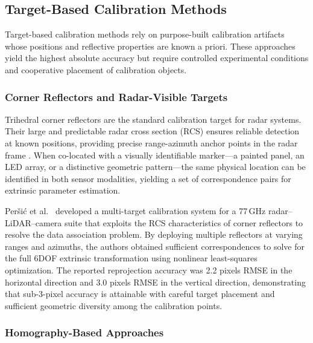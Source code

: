 \subsection{Target-Based Calibration Methods}\label{sec:target_based}

Target-based calibration methods rely on purpose-built calibration artifacts whose positions and reflective properties are known a priori. These approaches yield the highest absolute accuracy but require controlled experimental conditions and cooperative placement of calibration objects.

\subsubsection{Corner Reflectors and Radar-Visible Targets}

Trihedral corner reflectors are the standard calibration target for radar systems. Their large and predictable radar cross section (RCS) ensures reliable detection at known positions, providing precise range-azimuth anchor points in the radar frame \cite{Skolnik2008}. When co-located with a visually identifiable marker---a painted panel, an LED array, or a distinctive geometric pattern---the same physical location can be identified in both sensor modalities, yielding a set of correspondence pairs for extrinsic parameter estimation.

Per\v{s}i\'{c} et al.\ \cite{persic2019extrinsic} developed a multi-target calibration system for a 77\,GHz radar--LiDAR--camera suite that exploits the RCS characteristics of corner reflectors to resolve the data association problem. By deploying multiple reflectors at varying ranges and azimuths, the authors obtained sufficient correspondences to solve for the full 6DOF extrinsic transformation using nonlinear least-squares optimization. The reported reprojection accuracy was 2.2 pixels RMSE in the horizontal direction and 3.0 pixels RMSE in the vertical direction, demonstrating that sub-3-pixel accuracy is attainable with careful target placement and sufficient geometric diversity among the calibration points.

\subsubsection{Homography-Based Approaches}

